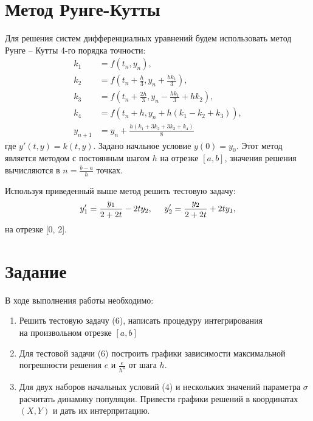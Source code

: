 \documentclass[a4paper,12pt]{article}
\begin{document}
\section{Метод Рунге-Кутты}
\hspace{0.5cm} Для решения систем дифференциалных уравнений будем использовать
метод Рунге -- Кутты 4-го порядка точности:
\begin{align}
    k_1 &= f(t_n, y_n), \nonumber \\
    k_2 &= f(t_n + \frac{h}{3}, y_n + \frac{hk_1}{3}), \nonumber \\
    k_3 &= f(t_n + \frac{2h}{3}, y_n - \frac{hk_1}{3} + hk_2),\\
    k_4 &= f(t_n + h, y_n + h(k_1 - k_2 + k_3)), \nonumber \\
    y_{n+1} &= y_n + \frac{h(k_1 + 3k_2 + 3k_3+ k_4)}{8} \nonumber
\end{align}
где $y'(t,y) = k(t,y)$. Задано начльное условие $y(0) = y_0$. Этот метод является методом
с постоянным шагом $h$ на отрезке $[a, b]$, значения решения вычисляются в $n = \frac{b-a}{h}$ точках.

Используя приведенный выше метод решить тестовую задачу:
\begin{equation}
    y'_1 = \frac{y_1}{2 + 2t} - 2ty_2, \hspace{0.5cm} y'_2 = \frac{y_2}{2 + 2t} + 2ty_1,
\end{equation}
на отрезке [0, 2].
\newpage

\section{Задание}
\hspace{0.5cm} В ходе выполнения работы необходимо:
\begin{enumerate}
    \item Решить тестовую задачу (6), написать процедуру интегрирования\\
    на произвольном отрезке $[a, b]$
    \item Для тестовой задачи (6) построить графики зависимости максимальной\\
    погрешности решения $e$ и $\frac{e}{h^4}$ от шага  $h$.
    \item Для двух наборов начальных условий (4) и нескольких значений параметра $\sigma$\\
    расчитать динамику популяции. Привести графики решений в координатах $(X, Y)$ и дать их интерпритацию.
\end{enumerate}
\newpage
\end{document}

